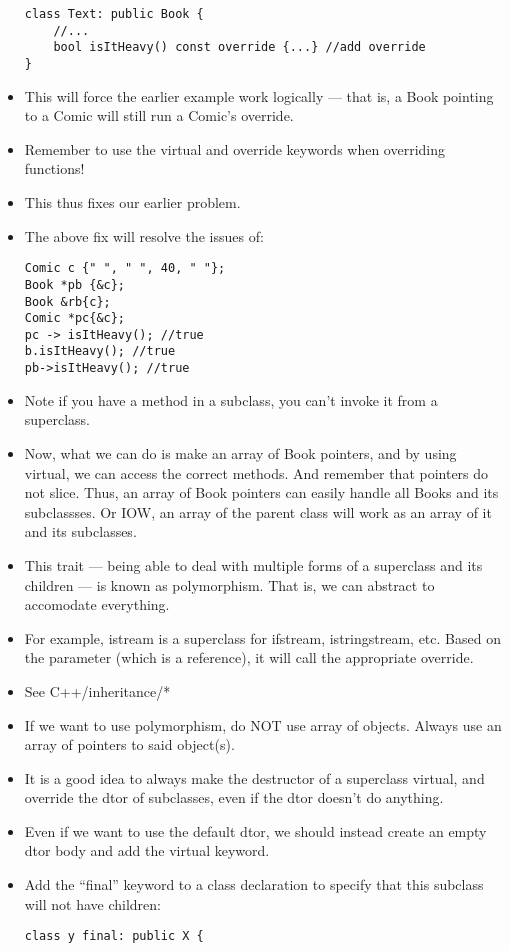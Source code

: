 \documentclass{article}
\begin{document}
\begin{itemize}
\begin{lstlisting}
class Text: public Book {
    //...
    bool isItHeavy() const override {...} //add override
}
\end{lstlisting}
\item This will force the earlier example work logically --- that is, a Book pointing to a Comic will still run a Comic's override.
\item Remember to use the virtual and override keywords when overriding functions!
\item This thus fixes our earlier problem.
\item The above fix will resolve the issues of:
\begin{lstlisting}
Comic c {" ", " ", 40, " "};
Book *pb {&c};
Book &rb{c};
Comic *pc{&c};
pc -> isItHeavy(); //true
b.isItHeavy(); //true
pb->isItHeavy(); //true
\end{lstlisting}
\item Note if you have a method in a subclass, you can't invoke it from a superclass.
\item Now, what we can do is make an array of Book pointers, and by using virtual, we can access the correct methods.  And remember that pointers do not slice.  Thus, an array of Book pointers can easily handle all Books and its subclassses.  Or IOW, an array of the parent class will work as an array of it and its subclasses.
\item This trait --- being able to deal with multiple forms of a superclass and its children --- is known as polymorphism.  That is, we can abstract to accomodate everything.
\item For example, istream is a superclass for ifstream, istringstream, etc.  Based on the parameter (which is a reference), it will call the appropriate override.
\item See C++/inheritance/*
\item If we want to use polymorphism, do NOT use array of objects.  Always use an array of pointers to said object(s).
\item It is a good idea to always make the destructor of a superclass virtual, and override the dtor of subclasses, even if the dtor doesn't do anything.
\item Even if we want to use the default dtor, we should instead create an empty dtor body and add the virtual keyword.
\item Add the ``final'' keyword to a class declaration to specify that this subclass will not have children:
\begin{lstlisting}
class y final: public X {

\end{lstlisting}
\end{itemize}
\end{document}
